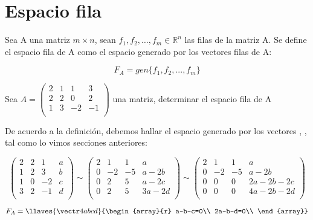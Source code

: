\newpage
\section{Espacio fila}
\begin{dfn}
Sea A una matriz $m\times n$, sean $f_1,f_2,\ldots, f_m \in \mathbb{R}^n$ las filas de la matriz A. Se define el espacio fila de A como el espacio generado por los vectores filas de A:

\[F_A=gen\{f_1, f_2, ..., f_m\}\]
\end{dfn}


\begin{ejemplo}
Sea $A=
\left(
\begin{array}{rrrr}
2&1&1&3\\
2&2&0&2\\
1&3&-2&-1\\
\end{array}
\right)$ una matriz, determinar el espacio fila de A

 
De acuerdo a la definición, debemos hallar el espacio generado por los vectores , ,  tal como lo vimos secciones anteriores:

\[
\left(
\begin{array}{rrr|r}
2&2&1&a\\
1&2&3&b\\
1&0&-2&c\\
3&2&-1&d\\
\end{array}
\right)
\sim
\left(
\begin{array}{rrr|r}
2&1&1&a\\
0&-2&-5&a-2b\\
0&2&5&a-2c\\
0&2&5&3a-2d\\
\end{array}
\right)
\sim
\left(
\begin{array}{rrr|r}
2&1&1&a\\
0&-2&-5&a-2b\\
0&0&0&2a-2b-2c\\
0&0&0&4a-2b-2d\\
\end{array}
\right)
\]

\[F_A=\llaves{\vectr4{a}{b}{c}{d}}
{\begin{array}{r}
a-b-c=0\\
2a-b-d=0\\
\end{array}}
\]

\end{ejemplo}


